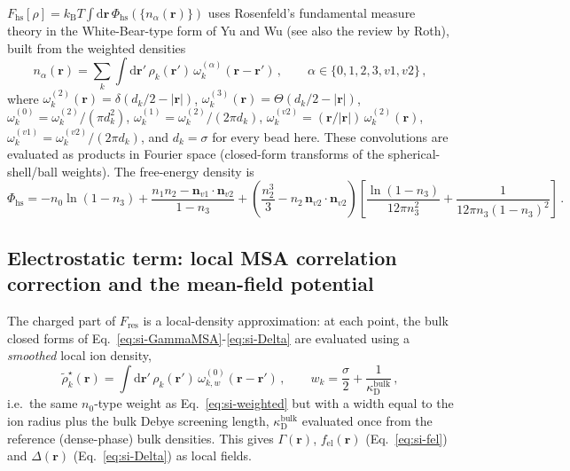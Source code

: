 \documentclass[journal=macl,manuscript=suppinfo,layout=onecolumn]{achemso}
\begin{document}
$F_\mathrm{hs}[\rho]=k_\mathrm{B}T\int\!\mathrm{d}\mathbf{r}\,\Phi_\mathrm{hs}(\{n_\alpha(\mathbf{r})\})$ uses Rosenfeld's fundamental measure theory\cite{rosenfeldFreeenergyModelInhomogeneous1989} in the White-Bear-type form of Yu and Wu\cite{yuStructuresHardsphereFluids2002} (see also the review by Roth\cite{rothFundamentalMeasureTheory2002}), built from the weighted densities
\begin{equation}
    n_\alpha(\mathbf{r}) = \sum_k \int\!\mathrm{d}\mathbf{r}'\,\rho_k(\mathbf{r}')\,\omega_k^{(\alpha)}(\mathbf{r}-\mathbf{r}')\,,\qquad \alpha\in\{0,1,2,3,v1,v2\}\,,
    \label{eq:si-weighted}
\end{equation}
where $\omega_k^{(2)}(\mathbf{r})=\delta(d_k/2-|\mathbf{r}|)$, $\omega_k^{(3)}(\mathbf{r})=\Theta(d_k/2-|\mathbf{r}|)$, $\omega_k^{(0)}=\omega_k^{(2)}/(\pi d_k^2)$, $\omega_k^{(1)}=\omega_k^{(2)}/(2\pi d_k)$, $\omega_k^{(v2)}=(\mathbf{r}/|\mathbf{r}|)\,\omega_k^{(2)}(\mathbf{r})$, $\omega_k^{(v1)}=\omega_k^{(v2)}/(2\pi d_k)$, and $d_k=\sigma$ for every bead here. These convolutions are evaluated as products in Fourier space (closed-form transforms of the spherical-shell/ball weights). The free-energy density is
\begin{equation}
    \Phi_\mathrm{hs} = -n_0\ln(1-n_3) + \frac{n_1n_2-\mathbf{n}_{v1}\!\cdot\!\mathbf{n}_{v2}}{1-n_3} + \left(\frac{n_2^3}{3}-n_2\,\mathbf{n}_{v2}\!\cdot\!\mathbf{n}_{v2}\right)\left[\frac{\ln(1-n_3)}{12\pi n_3^2}+\frac{1}{12\pi n_3(1-n_3)^2}\right]\,.
    \label{eq:si-Phihs}
\end{equation}

\subsection{Electrostatic term: local MSA correlation correction and the mean-field potential}
\label{si:elDFT}

The charged part of $F_\mathrm{res}$ is a local-density approximation: at each point, the bulk closed forms of Eq.~\ref{eq:si-GammaMSA}-\ref{eq:si-Delta} are evaluated using a \emph{smoothed} local ion density,
\begin{equation}
    \tilde\rho^\star_k(\mathbf{r}) = \int\!\mathrm{d}\mathbf{r}'\,\rho_k(\mathbf{r}')\,\omega^{(0)}_{k,w}(\mathbf{r}-\mathbf{r}')\,,\qquad w_k = \frac{\sigma}{2}+\frac{1}{\kappa_\mathrm{D}^\mathrm{bulk}}\,,
    \label{eq:si-smoothed}
\end{equation}
i.e.\ the same $n_0$-type weight as Eq.~\ref{eq:si-weighted} but with a width equal to the ion radius plus the bulk Debye screening length, $\kappa_\mathrm{D}^\mathrm{bulk}$ evaluated once from the reference (dense-phase) bulk densities. This gives $\Gamma(\mathbf{r})$, $f_\mathrm{el}(\mathbf{r})$ (Eq.~\ref{eq:si-fel}) and $\Delta(\mathbf{r})$ (Eq.~\ref{eq:si-Delta}) as local fields.
\end{document}
